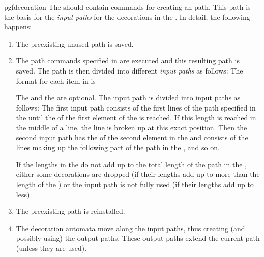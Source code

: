 \begin{environment}{{pgfdecoration}}
    The  should contain commands for creating an
    path. This path is the basis for the \emph{input paths} for the decorations
    in the . In detail, the following happens:
    \begin{enumerate}
        \item The preexisting unused path is saved.
        \item The path commands specified in  are
            executed and this resulting path is saved. The path is then divided
            into different \emph{input paths} as follows: The format for each
            item in  is
            \begin{quote}
            \end{quote}
            The  and the  are optional. The
            input path is divided into input paths as follows: The first input
            path consists of the first lines of the path specified in the
             until the   of the first
            element of the  is reached. If this length is
            reached in the middle of a line, the line is broken up at this
            exact position. Then the second input path has the  of
            the second element in the  and consists of
            the lines making up the following  part of the path in
            the , and so on.

            If the lengths in the  do not add up to the
            total length of the path in the , either
            some  decorations are dropped (if their lengths add up to more than
            the length of the ) or the input path is
            not fully used (if their lengths  add up to less).
        \item The preexisting path is reinstalled.
        \item The decoration automata move along the input paths, thus creating
            (and  possibly using) the output paths. These output paths extend
            the current path (unless they are used).
    \end{enumerate}


\end{environment}
